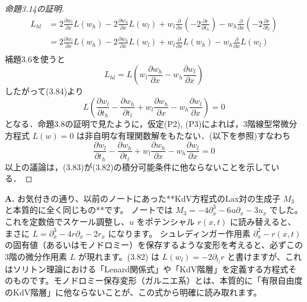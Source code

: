 \begin{story}
\begin{proof}[命題3.14の証明]
\begin{align*}
    L_{hl} &=2\frac{\partial w_l}{\partial x}L(w_h) - 2\frac{\partial w_h}{\partial x}L(w_l)+w_{l}\frac{\partial}{\partial x}\left(-2\frac{\partial r}{\partial t_{h}}\right)-w_{h}\frac{\partial}{\partial x}\left(-2\frac{\partial r}{\partial t_{l}}\right)\\
    &= 2\frac{\partial w_l}{\partial x}L(w_h) - 2\frac{\partial w_h}{\partial x}L(w_l) + w_l\frac{\partial}{\partial x}L(w_h) - w_h\frac{\partial}{\partial x}L(w_l) \\
\end{align*}
補題3.6を使うと
\begin{equation*}
    L_{hl} = L\left( w_l\frac{\partial w_h}{\partial x} - w_h\frac{\partial w_l}{\partial x} \right)
\end{equation*}
したがって(3.84)より
\begin{equation*}
    L\left( \frac{\partial w_l}{\partial t_h} - \frac{\partial w_h}{\partial t_l} + w_l\frac{\partial w_h}{\partial x} - w_h\frac{\partial w_l}{\partial x} \right) = 0
\end{equation*}
となる．命題3.8の証明で見たように，仮定(P2), (P3)によれば，3階線型常微分方程式 $L(w)=0$ は非自明な有理関数解をもたない．(以下を参照)すなわち
\begin{equation*}
    \frac{\partial w_l}{\partial t_h} - \frac{\partial w_h}{\partial t_l} + w_l\frac{\partial w_h}{\partial x} - w_h\frac{\partial w_l}{\partial x} = 0
\end{equation*}
以上の議論は，(3.83)が(3.82)の積分可能条件に他ならないことを示している．
\end{proof}
\end{story}

\begin{Q}
\textbf{A.} お気付きの通り、以前のノートにあった**KdV方程式のLax対の生成子 $M_3$ と本質的に全く同じもの**です。
ノートでは $M_3 = -4\partial_x^3 - 6u\partial_x - 3u_x$ でした。これを定数倍でスケール調整し、$u$ をポテンシャル $r(x,t)$ に読み替えると、まさに $L = \partial_x^3 - 4r\partial_x - 2r_x$ になります。
シュレディンガー作用素 $\partial_x^2 - r(x,t)$ の固有値（あるいはモノドロミー）を保存するような変形を考えると、必ずこの3階の微分作用素 $L$ が現れます。(3.82) は $L(w_l) = -2\partial_{t_l}r$ と書けますが、これはソリトン理論における「Lenard関係式」や「KdV階層」を定義する方程式そのものです。モノドロミー保存変形（ガルニエ系）とは、本質的に「有限自由度のKdV階層」に他ならないことが、この式から明確に読み取れます。
\end{Q}

